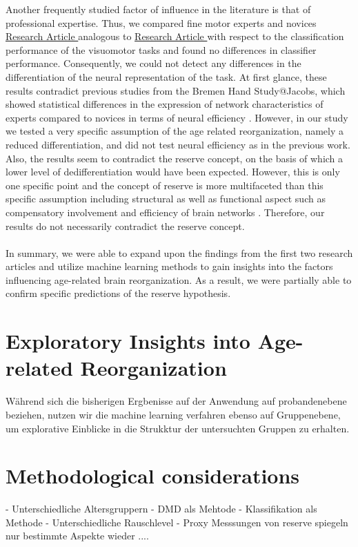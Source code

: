 Another frequently studied factor of influence in the literature is that of professional expertise. Thus, we compared fine motor experts and novices \hyperref[results:paperIV]{Research Article } analogous to \hyperref[results:paperI]{Research Article } with respect to the classification performance of the visuomotor tasks and found no differences in classifier performance. Consequently, we could not detect any differences in the differentiation of the neural representation of the task. At first glance, these results contradict previous studies from the Bremen Hand Study@Jacobs, which showed statistical differences in the expression of network characteristics of experts compared to novices in terms of neural efficiency \cite{Goelz2018, vieluf2018age}. However, in our study we tested a very specific assumption of the age related reorganization, namely a reduced differentiation, and did not test neural efficiency as in the previous work. Also, the results seem to contradict the reserve concept, on the basis of which a lower level of dedifferentiation would have been expected. However, this is only one specific point and the concept of reserve is more multifaceted than this specific assumption including structural as well as functional aspect such as compensatory involvement and efficiency of brain networks \cite{Cabeza2018}. Therefore, our results do not necessarily contradict the reserve concept.\\
\\
In summary, we were able to expand upon the findings from the first two research articles and utilize machine learning methods to gain insights into the factors influencing age-related brain reorganization. As a result, we were partially able to confirm specific predictions of the reserve hypothesis. 

\section{Exploratory Insights into Age-related Reorganization}
Während sich die bisherigen Ergbenisse auf der Anwendung auf probandenebene beziehen, nutzen wir die machine learning verfahren ebenso auf Gruppenebene, um explorative Einblicke in die Strukktur der untersuchten Gruppen zu erhalten. 

\section{Methodological considerations}
- Unterschiedliche Altersgruppern
- DMD als Mehtode
- Klassifikation als Methode 
- Unterschiedliche Rauschlevel 
- Proxy Messsungen von reserve spiegeln nur bestimmte Aspekte wieder
....


